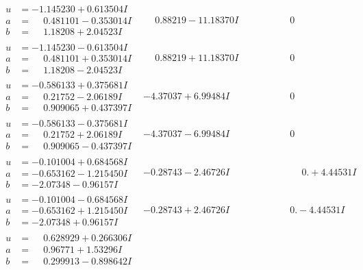 \documentclass[1p]{elsarticle_modified}
\theoremstyle{definition}
\begin{document}
$$\begin{array}{c|c|c}
\begin{aligned}
u &= -1.145230 + 0.613504 I \\
a &= \phantom{-}0.481101 - 0.353014 I \\
b &= \phantom{-}1.18208 + 2.04523 I\end{aligned}
 & \phantom{-}0.88219 - 11.18370 I & \phantom{-0.000000 } 0 \\ \hline\begin{aligned}
u &= -1.145230 - 0.613504 I \\
a &= \phantom{-}0.481101 + 0.353014 I \\
b &= \phantom{-}1.18208 - 2.04523 I\end{aligned}
 & \phantom{-}0.88219 + 11.18370 I & \phantom{-0.000000 } 0 \\ \hline\begin{aligned}
u &= -0.586133 + 0.375681 I \\
a &= \phantom{-}0.21752 - 2.06189 I \\
b &= \phantom{-}0.909065 + 0.437397 I\end{aligned}
 & -4.37037 + 6.99484 I & \phantom{-0.000000 } 0 \\ \hline\begin{aligned}
u &= -0.586133 - 0.375681 I \\
a &= \phantom{-}0.21752 + 2.06189 I \\
b &= \phantom{-}0.909065 - 0.437397 I\end{aligned}
 & -4.37037 - 6.99484 I & \phantom{-0.000000 } 0 \\ \hline\begin{aligned}
u &= -0.101004 + 0.684568 I \\
a &= -0.653162 - 1.215450 I \\
b &= -2.07348 - 0.96157 I\end{aligned}
 & -0.28743 - 2.46726 I & \phantom{-0.000000 -}0. + 4.44531 I \\ \hline\begin{aligned}
u &= -0.101004 - 0.684568 I \\
a &= -0.653162 + 1.215450 I \\
b &= -2.07348 + 0.96157 I\end{aligned}
 & -0.28743 + 2.46726 I & \phantom{-0.000000 } 0. - 4.44531 I \\ \hline\begin{aligned}
u &= \phantom{-}0.628929 + 0.266306 I \\
a &= \phantom{-}0.96771 + 1.53296 I \\
b &= \phantom{-}0.299913 - 0.898642 I\end{aligned}

\end{array}$$
\end{document}
